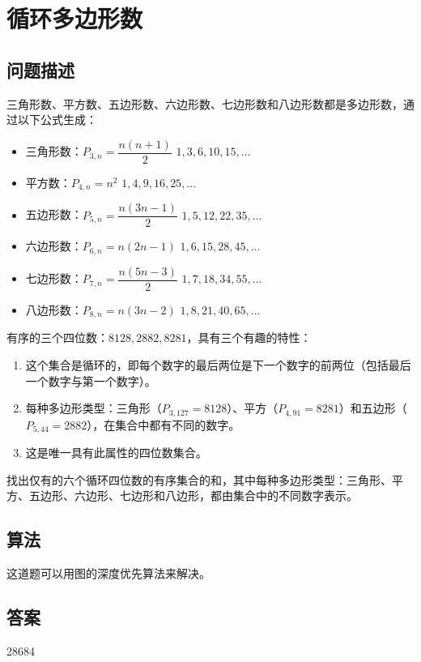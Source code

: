 \section{循环多边形数}
\subsection{问题描述}
\begin{tcolorbox}
	三角形数、平方数、五边形数、六边形数、七边形数和八边形数都是多边形数，通过以下公式生成：

	\begin{itemize}
		\item 三角形数：$P_{3,n} = \dfrac{n(n+1)}{2}$ \quad $1, 3, 6, 10, 15, \dots$
		\item 平方数：$P_{4,n} = n^2$ \quad $1, 4, 9, 16, 25, \dots$
		\item 五边形数：$P_{5,n} = \dfrac{n(3n-1)}{2}$ \quad $1, 5, 12, 22, 35, \dots$
		\item 六边形数：$P_{6,n} = n(2n-1)$ \quad $1, 6, 15, 28, 45, \dots$
		\item 七边形数：$P_{7,n} = \dfrac{n(5n-3)}{2}$ \quad $1, 7, 18, 34, 55, \dots$
		\item 八边形数：$P_{8,n} = n(3n-2)$ \quad $1, 8, 21, 40, 65, \dots$
	\end{itemize}

	有序的三个四位数：$8128, 2882, 8281$，具有三个有趣的特性：

	\begin{enumerate}
		\item 这个集合是循环的，即每个数字的最后两位是下一个数字的前两位（包括最后一个数字与第一个数字）。
		\item 每种多边形类型：三角形（$P_{3,127} = 8128$）、平方（$P_{4,91} = 8281$）和五边形（$P_{5,44} = 2882$），在集合中都有不同的数字。
		\item 这是唯一具有此属性的四位数集合。
	\end{enumerate}

	找出仅有的六个循环四位数的有序集合的和，其中每种多边形类型：三角形、平方、五边形、六边形、七边形和八边形，都由集合中的不同数字表示。

\end{tcolorbox}

\subsection{算法}
这道题可以用图的深度优先算法来解决。

\subsection{答案}
28684
